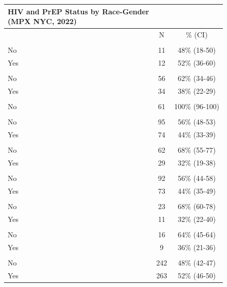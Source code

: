 \documentclass[
  letterpaper,
  DIV=11,
  numbers=noendperiod,
  oneside]{scrreprt}
\begin{document}
\begin{longtable*}{lcc}
\caption*{
{\large HIV and PrEP Status by Race-Gender} \\ 
{\small (MPX NYC, 2022)}
} \\ 
\toprule
 & N & \% (CI) \\ 
\midrule\addlinespace[2.5pt]
 \\ 
\midrule\addlinespace[2.5pt]
No & 11 & 48\% (18-50) \\ 
Yes & 12 & 52\% (36-60) \\ 
\midrule\addlinespace[2.5pt]
 \\ 
\midrule\addlinespace[2.5pt]
No & 56 & 62\% (34-46) \\ 
Yes & 34 & 38\% (22-29) \\ 
\midrule\addlinespace[2.5pt]
 \\ 
\midrule\addlinespace[2.5pt]
No & 61 & 100\% (96-100) \\ 
\midrule\addlinespace[2.5pt]
 \\ 
\midrule\addlinespace[2.5pt]
No & 95 & 56\% (48-53) \\ 
Yes & 74 & 44\% (33-39) \\ 
\midrule\addlinespace[2.5pt]
 \\ 
\midrule\addlinespace[2.5pt]
No & 62 & 68\% (55-77) \\ 
Yes & 29 & 32\% (19-38) \\ 
\midrule\addlinespace[2.5pt]
 \\ 
\midrule\addlinespace[2.5pt]
No & 92 & 56\% (44-58) \\ 
Yes & 73 & 44\% (35-49) \\ 
\midrule\addlinespace[2.5pt]
 \\ 
\midrule\addlinespace[2.5pt]
No & 23 & 68\% (60-78) \\ 
Yes & 11 & 32\% (22-40) \\ 
\midrule\addlinespace[2.5pt]
 \\ 
\midrule\addlinespace[2.5pt]
No & 16 & 64\% (45-64) \\ 
Yes & 9 & 36\% (21-36) \\ 
\midrule\addlinespace[2.5pt]
 \\ 
\midrule\addlinespace[2.5pt]
No & 242 & 48\% (42-47) \\ 
Yes & 263 & 52\% (46-50) \\ 
\bottomrule
\end{longtable*}
\end{document}

